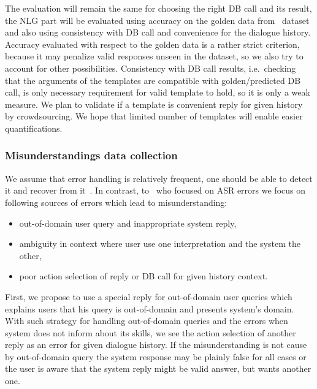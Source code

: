 \documentclass[11pt]{article}
\begin{document}
The evaluation will remain the same for choosing the right DB call and its result, the NLG part will be evaluated using accuracy on the golden data from~\cite{platek2016wochat} dataset and also using consistency with DB call and convenience for the dialogue history.
Accuracy evaluated with respect to the golden data is a rather strict criterion, because it may penalize valid responses unseen in the dataset, so we also try to account for other possibilities.
Consistency with DB call results, i.e.\ checking that the arguments of the templates are compatible with golden/predicted DB call, is only necessary requirement for valid template to hold, so it is only a weak measure.
We plan to validate if a template is convenient reply for given history by crowdsourcing.
We hope that limited number of templates will enable easier quantifications.

\subsubsection*{Misunderstandings data collection}
We assume that error handling is relatively frequent, one should be able to detect it and recover from it~\cite{skantze_error_2007}.
In contrast, to~\cite{skantze_error_2007} who focused on ASR errors we focus on following sources of errors which lead to misunderstanding:
\begin{itemize}
    \item out-of-domain user query and inappropriate system reply,
    \item ambiguity in context where user use one interpretation and the system the other,
    \item poor action selection of reply or DB call for given history context.
\end{itemize}
First, we propose to use a special reply for out-of-domain user queries which explains users that his query is out-of-domain and presents system's domain.~\cite{platek_self_2015}
With such strategy for handling out-of-domain queries and the errors when system does not inform about its skills, we see the action selection of another reply as an error for given dialogue history.
If the misunderstanding is not cause by out-of-domain query the system response may be plainly false for all cases or the user is aware that the system reply might be valid answer, but wants another one.
%
\end{document}
